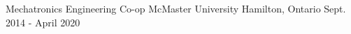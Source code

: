 
\begin{cventries}

  \cventry
    {Mechatronics Engineering Co-op} %
    {McMaster University} %
    {Hamilton, Ontario} %
    {Sept. 2014 - April 2020} %
    {}



\end{cventries}
